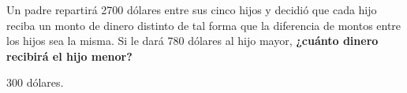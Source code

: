 Un padre repartirá 2700 dólares entre sus cinco hijos y decidió que cada hijo reciba un monto de dinero distinto de tal forma que la diferencia de montos entre los hijos sea la misma.
Si le dará 780 dólares al hijo mayor,
\textbf{¿cuánto dinero recibirá el hijo menor?}

\begin{solutionbox}{2cm}
    300 dólares.
\end{solutionbox}